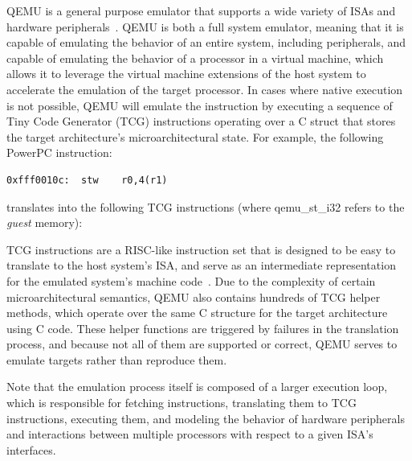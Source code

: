 \begin{example}[QEMU]

QEMU is a general purpose emulator that supports a wide variety of ISAs and hardware peripherals~\cite{bellard2005qemu}.
QEMU is both a full system emulator, meaning that it is capable of emulating the behavior of an entire system, including peripherals, and capable of emulating the behavior of a processor in a virtual machine, which allows it to leverage the virtual machine extensions of the host system to accelerate the emulation of the target processor.
In cases where native execution is not possible, QEMU will emulate the instruction by executing a sequence of Tiny Code Generator (TCG) instructions operating over a C struct that stores the target architecture's microarchitectural state.
For example, the following PowerPC instruction:



\begin{center}
\begin{lstlisting}[]
0xfff0010c:  stw    r0,4(r1)
\end{lstlisting}
\end{center}

\noindent
translates into the following TCG instructions (where qemu\_st\_i32 refers to the \emph{guest} memory):

\begin{center}

\end{center}

TCG instructions are a RISC-like instruction set that is designed to be easy to translate to the host system's ISA, and serve as an intermediate representation for the emulated system's machine code~\cite{tcg}.
Due to the complexity of certain microarchitectural semantics, QEMU also contains hundreds of TCG helper methods, which operate over the same C structure for the target architecture using C code.
These helper functions are triggered by failures in the translation process, and because not all of them are supported or correct, QEMU serves to emulate targets rather than reproduce them.

Note that the emulation process itself is composed of a larger execution loop, which is responsible for fetching instructions, translating them to TCG instructions, executing them, and modeling the behavior of hardware peripherals and interactions between multiple processors with respect to a given ISA's interfaces.

\end{example}


